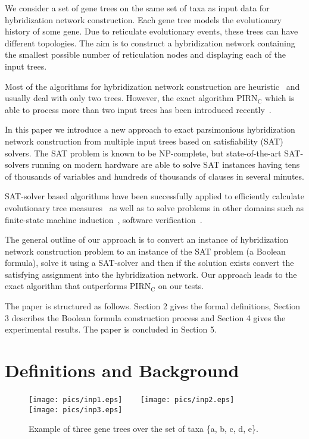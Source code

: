 \documentclass[runningheads, envcountsame, a4paper]{llncs}
\begin{document}
We consider a set of gene trees on the same set of taxa as input data for hybridization network construction.
Each gene tree models the evolutionary history of some gene. 
Due to reticulate evolutionary events, these trees can have different topologies.
The aim is to construct a hybridization network containing the smallest possible number of 
reticulation nodes and displaying each of the input trees. 

Most of the algorithms for hybridization network construction are heuristic~\cite{wu2010close, park2012murpar} 
and usually deal with only two trees.
However, the exact algorithm PIRN$_\mathrm{C}$ which is able to process more than two input trees has been introduced recently~\cite{wu2013algorithm}.

In this paper we introduce a new approach to exact parsimonious
hybridization network construction from multiple input trees based on satisfiability (SAT) solvers.
The SAT problem is known to be NP-complete, but state-of-the-art SAT-solvers running on modern hardware 
are able to solve SAT instances having tens of thousands of variables and hundreds of thousands of clauses in several minutes.

SAT-solver based algorithms have been successfully applied to efficiently calculate evolutionary tree measures~\cite{bonet2009efficiently}
as well as to solve problems in other domains such as
finite-state machine induction~\cite{heule2010exact}, software verification~\cite{biere2003bounded}.

The general outline of our approach is to convert an instance of hybridization network construction 
problem to an instance of the SAT problem (a Boolean formula), solve it using a SAT-solver and then if the
solution exists convert 
the satisfying assignment into the hybridization network.
Our approach leads to the exact algorithm that outperforms PIRN$\mathrm{_C}$ on our tests.

The paper is structured as follows. Section 2 gives the formal definitions, Section 3 describes the Boolean formula
construction process and Section 4 gives the experimental results. The paper is concluded in Section 5.

\section{Definitions and Background}

\begin{figure}[t]
  \centering
  \texttt{[image: pics/inp1.eps]}
  ~~~
  \texttt{[image: pics/inp2.eps]}
  ~~~
  \texttt{[image: pics/inp3.eps]}
  \caption{Example of three gene trees over the set of taxa \{a, b, c, d, e\}.}
  \label{input-example}
\end{figure}
\end{document}
